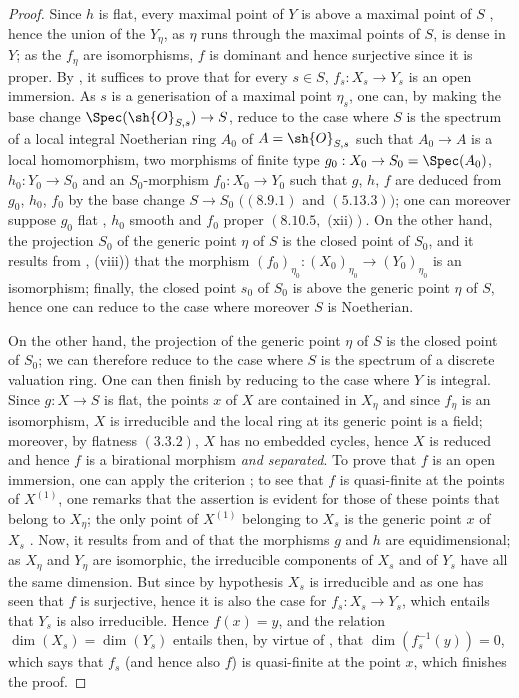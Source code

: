 \begin{proof}
Since $h$ is flat, every maximal point of $Y$ is above a maximal point of $S$ , hence the union of the $Y_\eta$, as $\eta$ runs through the maximal points of $S$, is dense in $Y$; as the $f_\eta$ are isomorphisms, $f$ is dominant and hence surjective since it is proper.
By , it suffices to prove that for every $s\in S$, $f_s:X_s\to Y_s$ is an open immersion.
As $s$ is a generisation of a maximal point $\eta_s$, one can, by making the base change $\Spec(\sh{O}_{S,s})\to S$, reduce to the case where $S$ is the spectrum of a local integral Noetherian ring $A_0$ of $A=\sh{O}_{S,s}$ such that $A_0\to A$ is a local homomorphism, two morphisms of finite type $g_0:X_0\to S_0=\Spec(A_0)$, $h_0:Y_0\to S_0$ and an $S_0$-morphism $f_0:X_0\to Y_0$ such that $g$, $h$, $f$ are deduced from $g_0$, $h_0$, $f_0$ by the base change $S\to S_0$ $((8.9.1)$ and $(5.13.3))$; one can moreover suppose $g_0$ flat , $h_0$ smooth  and $f_0$ proper $(8.10.5,\text{ (xii)})$.
On the other hand, the projection $S_0$ of the generic point $\eta$ of $S$ is the closed point of $S_0$, and it results from , (viii)) that the morphism $(f_0)_{\eta_0}:(X_0)_{\eta_0}\to(Y_0)_{\eta_0}$ is an isomorphism; finally, the closed point $s_0$ of $S_0$ is above the generic point $\eta$ of $S$, hence one can reduce to the case where moreover $S$ is Noetherian.

On the other hand, the projection of the generic point $\eta$ of $S$ is the closed point of $S_0$;
we can therefore reduce to the case where $S$ is the spectrum of a discrete valuation ring.
One can then finish by reducing to the case where $Y$ is integral.
Since $g:X\to S$ is flat, the points $x$ of $X$ are contained in $X_\eta$  and since $f_\eta$ is an isomorphism, $X$ is irreducible and the local ring at its generic point is a field; moreover, by flatness $(3.3.2)$, $X$ has no embedded cycles, hence $X$ is reduced  and hence $f$ is a birational morphism \emph{and separated}.
To prove that $f$ is an open immersion, one can apply the criterion ; to see that $f$ is quasi-finite at the points of $X^{(1)}$, one remarks that the assertion is evident for those of these points that belong to $X_\eta$; the only point of $X^{(1)}$ belonging to $X_s$ is the generic point $x$ of $X_s$ .
Now, it results from  and of  that the morphisms $g$ and $h$ are equidimensional; as $X_\eta$ and $Y_\eta$ are isomorphic, the irreducible components of $X_s$ and of $Y_s$ have all the same dimension.
But since by hypothesis $X_s$ is irreducible and as one has seen that $f$ is surjective, hence it is also the case for $f_s:X_s\to Y_s$, which entails that $Y_s$ is also irreducible.
Hence $f(x)=y$, and the relation $\dim(X_s)=\dim(Y_s)$ entails then, by virtue of , that $\dim(f_s^{-1}(y))=0$, which says that $f_s$ (and hence also $f$) is quasi-finite at the point $x$, which finishes the proof.
\end{proof}


